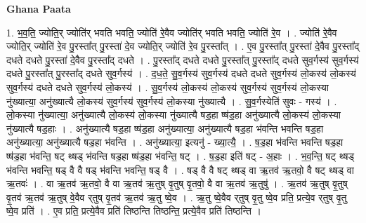 \documentclass[17pt]{extarticle}
\begin{document}
\textbf{Ghana Paata } \newline

1. भ॒व॒ति॒ ज्योति॒र् ज्योति॑र् भवति भवति॒ ज्योति॑ रे॒वैव ज्योति॑र् भवति भवति॒ ज्योति॑ रे॒व । . ज्योति॑ रे॒वैव ज्योति॒र् ज्योति॑ रे॒व पु॒रस्ता᳚त् पु॒रस्ता॑ दे॒व ज्योति॒र् ज्योति॑ रे॒व पु॒रस्ता᳚त् । . ए॒व पु॒रस्ता᳚त् पु॒रस्ता॑ दे॒वैव पु॒रस्ता᳚द् दधते दधते पु॒रस्ता॑ दे॒वैव पु॒रस्ता᳚द् दधते । . पु॒रस्ता᳚द् दधते दधते पु॒रस्ता᳚त् पु॒रस्ता᳚द् दधते सुव॒र्गस्य॑ सुव॒र्गस्य॑ दधते पु॒रस्ता᳚त् पु॒रस्ता᳚द् दधते सुव॒र्गस्य॑ । . द॒ध॒ते॒ सु॒व॒र्गस्य॑ सुव॒र्गस्य॑ दधते दधते सुव॒र्गस्य॑ लो॒कस्य॑ लो॒कस्य॑ सुव॒र्गस्य॑ दधते दधते सुव॒र्गस्य॑ लो॒कस्य॑ । . सु॒व॒र्गस्य॑ लो॒कस्य॑ लो॒कस्य॑ सुव॒र्गस्य॑ सुव॒र्गस्य॑ लो॒कस्या नु॑ख्यात्या॒ अनु॑ख्यात्यै लो॒कस्य॑ सुव॒र्गस्य॑ सुव॒र्गस्य॑ लो॒कस्या नु॑ख्यात्यै । . सु॒व॒र्गस्येति॑ सुवः - गस्य॑ । . लो॒कस्या नु॑ख्यात्या॒ अनु॑ख्यात्यै लो॒कस्य॑ लो॒कस्या नु॑ख्यात्यै षड॒हा ष्ष॑ड॒हा अनु॑ख्यात्यै लो॒कस्य॑ लो॒कस्या नु॑ख्यात्यै षड॒हाः । . अनु॑ख्यात्यै षड॒हा ष्ष॑ड॒हा अनु॑ख्यात्या॒ अनु॑ख्यात्यै षड॒हा भ॑वन्ति भवन्ति षड॒हा अनु॑ख्यात्या॒ अनु॑ख्यात्यै षड॒हा भ॑वन्ति । . अनु॑ख्यात्या॒ इत्यनु॑ - ख्या॒त्यै॒ । . ष॒ड॒हा भ॑वन्ति भवन्ति षड॒हा ष्ष॑ड॒हा भ॑वन्ति॒ षट् थ्षड् भ॑वन्ति षड॒हा ष्ष॑ड॒हा भ॑वन्ति॒ षट् । . ष॒ड॒हा इति॑ षट् - अ॒हाः । . भ॒व॒न्ति॒ षट् थ्षड् भ॑वन्ति भवन्ति॒ षड् वै वै षड् भ॑वन्ति भवन्ति॒ षड् वै । . षड् वै वै षट् थ्षड् वा ऋ॒तव॑ ऋ॒तवो॒ वै षट् थ्षड् वा ऋ॒तवः॑ । . वा ऋ॒तव॑ ऋ॒तवो॒ वै वा ऋ॒तव॑ ऋ॒तुष् वृ॒तुष् वृ॒तवो॒ वै वा ऋ॒तव॑ ऋ॒तुषु॑ । . ऋ॒तव॑ ऋ॒तुष् वृ॒तुष् वृ॒तव॑ ऋ॒तव॑ ऋ॒तुष् वे॒वैव र्‌तुष् वृ॒तव॑ ऋ॒तव॑ ऋ॒तु ष्वे॒व । . ऋ॒तु ष्वे॒वैव र्‌तुष् वृ॒तु ष्वे॒व प्रति॒ प्रत्ये॒व र्‌तुष् वृ॒तु ष्वे॒व प्रति॑ । . ए॒व प्रति॒ प्रत्ये॒वैव प्रति॑ तिष्ठन्ति तिष्ठन्ति॒ प्रत्ये॒वैव प्रति॑ तिष्ठन्ति । \newline
\end{document}
